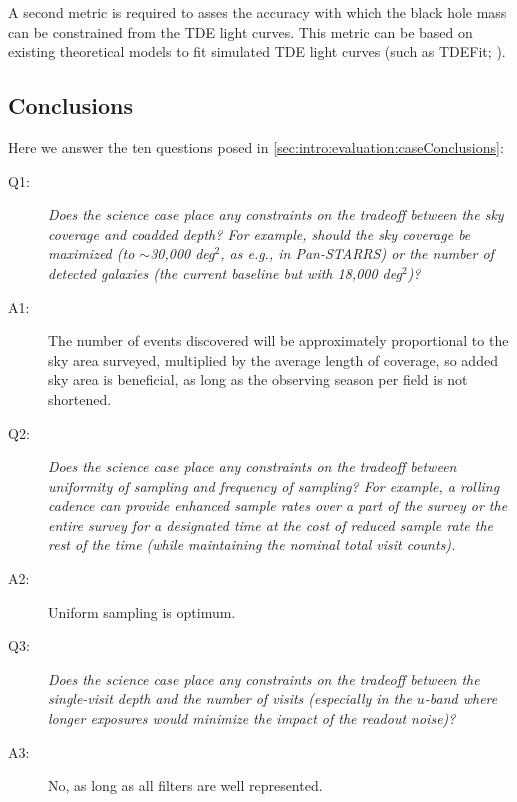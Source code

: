 A second metric is required to asses the accuracy with which the black
hole mass can be constrained from the TDE light curves. This metric can
be based on existing theoretical models to fit simulated TDE light
curves (such as TDEFit; \citealt{Guillochon2014}).

%
 \subsection{Conclusions}

 Here we answer the ten questions posed in
 \autoref{sec:intro:evaluation:caseConclusions}:

 \begin{description}

 \item[Q1:] {\it Does the science case place any constraints on the
 tradeoff between the sky coverage and coadded depth? For example, should
 the sky coverage be maximized (to $\sim$30,000 deg$^2$, as e.g., in
 Pan-STARRS) or the number of detected galaxies (the current baseline but
 with 18,000 deg$^2$)?}

 \item[A1:] The number of events discovered will be approximately proportional to the sky area surveyed, multiplied by the 
 average length of coverage, so added sky area is beneficial, as long as the observing season per field is not shortened.

 \item[Q2:] {\it Does the science case place any constraints on the
 tradeoff between uniformity of sampling and frequency of  sampling? For
 example, a rolling cadence can provide enhanced sample rates over a part
 of the survey or the entire survey for a designated time at the cost of
 reduced sample rate the rest of the time (while maintaining the nominal
 total visit counts).}

 \item[A2:] Uniform sampling is optimum.

 \item[Q3:] {\it Does the science case place any constraints on the
 tradeoff between the single-visit depth and the number of visits
 (especially in the $u$-band where longer exposures would minimize the
 impact of the readout noise)?}

 \item[A3:] No, as long as all filters are well represented.


\end{description}
